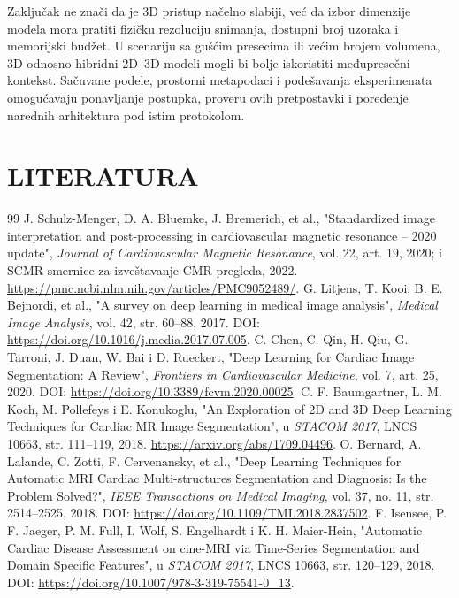 \documentclass[11pt,a4paper]{article}
\begin{document}
Zaključak ne znači da je 3D pristup načelno slabiji, već da izbor dimenzije modela mora pratiti
fizičku rezoluciju snimanja, dostupni broj uzoraka i memorijski budžet. U scenariju sa gušćim
presecima ili većim brojem volumena, 3D odnosno hibridni 2D--3D modeli mogli bi bolje iskoristiti
međupresečni kontekst. Sačuvane podele, prostorni metapodaci i podešavanja eksperimenata
omogućavaju ponavljanje postupka, proveru ovih pretpostavki i poređenje narednih arhitektura pod
istim protokolom.

\clearpage
\section{LITERATURA}
\begin{thebibliography}{99}
	\small
	 J. Schulz-Menger, D. A. Bluemke, J. Bremerich, et al., "Standardized image interpretation and post-processing in cardiovascular magnetic resonance -- 2020 update", \textit{Journal of Cardiovascular Magnetic Resonance}, vol. 22, art. 19, 2020; i SCMR smernice za izveštavanje CMR pregleda, 2022. \url{https://pmc.ncbi.nlm.nih.gov/articles/PMC9052489/}.
	 G. Litjens, T. Kooi, B. E. Bejnordi, et al., "A survey on deep learning in medical image analysis", \textit{Medical Image Analysis}, vol. 42, str. 60--88, 2017. DOI: \url{https://doi.org/10.1016/j.media.2017.07.005}.
	 C. Chen, C. Qin, H. Qiu, G. Tarroni, J. Duan, W. Bai i D. Rueckert, "Deep Learning for Cardiac Image Segmentation: A Review", \textit{Frontiers in Cardiovascular Medicine}, vol. 7, art. 25, 2020. DOI: \url{https://doi.org/10.3389/fcvm.2020.00025}.
	 C. F. Baumgartner, L. M. Koch, M. Pollefeys i E. Konukoglu, "An Exploration of 2D and 3D Deep Learning Techniques for Cardiac MR Image Segmentation", u \textit{STACOM 2017}, LNCS 10663, str. 111--119, 2018. \url{https://arxiv.org/abs/1709.04496}.
	 O. Bernard, A. Lalande, C. Zotti, F. Cervenansky, et al., "Deep Learning Techniques for Automatic MRI Cardiac Multi-structures Segmentation and Diagnosis: Is the Problem Solved?", \textit{IEEE Transactions on Medical Imaging}, vol. 37, no. 11, str. 2514--2525, 2018. DOI: \url{https://doi.org/10.1109/TMI.2018.2837502}.
	 F. Isensee, P. F. Jaeger, P. M. Full, I. Wolf, S. Engelhardt i K. H. Maier-Hein, "Automatic Cardiac Disease Assessment on cine-MRI via Time-Series Segmentation and Domain Specific Features", u \textit{STACOM 2017}, LNCS 10663, str. 120--129, 2018. DOI: \url{https://doi.org/10.1007/978-3-319-75541-0_13}.

\end{thebibliography}
\end{document}
